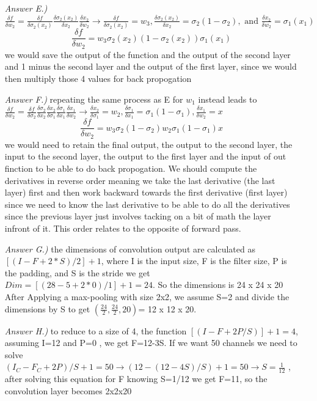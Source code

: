 \documentclass{article}
\theoremstyle{definition}
\theoremstyle{remark}
\begin{document}
\begin{enumerate}[font={\Large\bfseries}]
\begin{itemize}
			\item[\textit{Answer E.)}] $\frac{\delta f}{\delta w_2} = 
			\frac{\delta f}{\delta \sigma_2(x_2)} \frac{\delta \sigma_2(x_2)}{\delta x_2} \frac{\delta x_2}{\delta w_2} \rightarrow
			\frac{\delta f}{\delta \sigma_2(x_2)} = w_3, 
			\frac{\delta \sigma_2(x_2)}{\delta x_2} = \sigma_2 (1-\sigma_2), 
			\text{ and } \frac{\delta x_2}{\delta w_2} = \sigma_1(x_1)$
			$$\frac{\delta f}{\delta w_2} = w_3 \sigma_2(x_2) (1-\sigma_2(x_2)) \sigma_1(x_1)$$
			we would save the output of the function and the output of the second layer and 1 minus the second layer and the output of the first layer,
			since we would then multiply those 4 values for back propogation
			
			\item[\textit{Answer F.)}] repeating the same process as E for $w_1$ instead leads to\\ 
			$\frac{\delta f}{\delta w_2} = 
			\frac{\delta f}{\delta \sigma_2} \frac{\delta \sigma_2}{\delta x_2} \frac{\delta x_2}{\delta \sigma_1} \frac{\delta \sigma_1}{\delta x_1} \frac{\delta x_1}{\delta w_2} \rightarrow 
			\frac{\delta x_2}{\delta \sigma_1} = w_2, 
			\frac{\delta \sigma_1}{\delta x_1} = \sigma_1 (1-\sigma_1), 
			\frac{\delta x_1}{\delta w_2} = x$
			$$\frac{\delta f}{\delta w_2} = w_3 \sigma_2(1-\sigma_2) w_2 \sigma_1(1-\sigma_1) x$$
			we would need to retain the final output, the output to the second layer, the input to the second layer, the output to the first layer
			and the input of out finction to be able to do back propogation. We should compute the derivatives in reverse order meaning we take
			the last derivative (the last layer) first and then work backward towards the first derivative (first layer) since we need to know the
			last derivative to be able to do all the derivatives since the previous layer just involves tacking on a bit of math the layer infront of it.
			This order relates to the opposite of forward pass.

			\item[\textit{Answer G.)}] the dimensions of convolution output are calculated as $[(I - F + 2*S)/2]+1$, where I is the input size, 
			F is the filter size, P is the padding, and S is the stride we get $Dim = [(28 - 5 + 2 * 0) / 1] + 1 = 24$. So the dimensions is 24 x 24 x 20\\
			After Applying a max-pooling with size 2x2, we assume S=2 and divide the dimensions by S to get $(\frac{24}{2},\frac{24}{2},20) $= 12 x 12 x 20. 

			\item[\textit{Answer H.)}] to reduce to a size of 4, the function $[(I-F+2P/S)]+1=4$, assuming I=12 and P=0 , we get F=12-3S.
			If we want 50 channels we need to solve $(I_C - F_C + 2P)/S + 1 = 50 \rightarrow (12 - (12-4S)/S) + 1 = 50 \rightarrow S=\frac{1}{12}$
			, after solving this equation for F knowing S=1/12 we get F=11, so the convolution layer becomes 2x2x20
		\end{itemize}


\end{enumerate}
\end{document}
